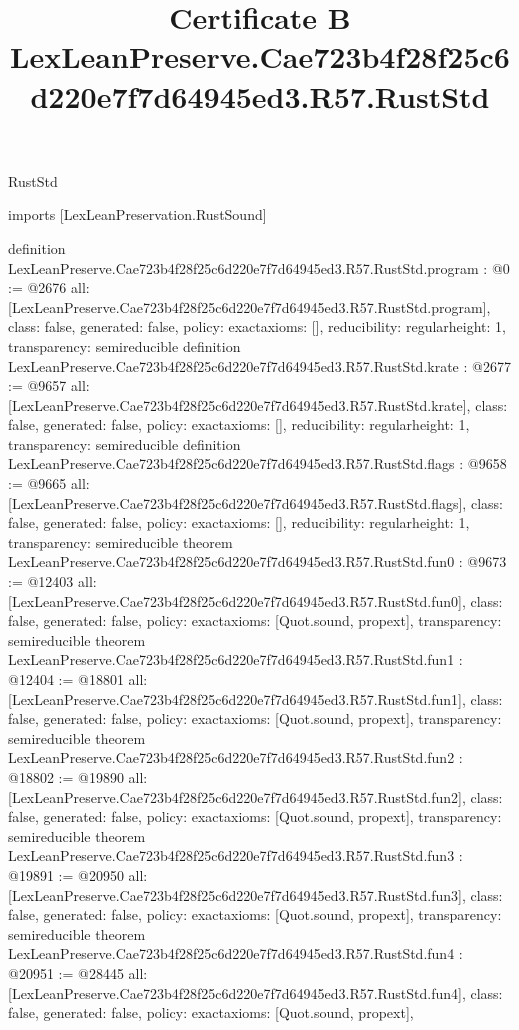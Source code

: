 \begin{lexlean}{RustStd}
\title{Certificate B LexLeanPreserve.Cae723b4f28f25c6d220e7f7d64945ed3.R57.RustStd}
\begin{coremodule}
imports [LexLeanPreservation.RustSound]

definition LexLeanPreserve.Cae723b4f28f25c6d220e7f7d64945ed3.R57.RustStd.program : @0 := @2676 {
  all: [LexLeanPreserve.Cae723b4f28f25c6d220e7f7d64945ed3.R57.RustStd.program],
  class: false,
  generated: false,
  policy: exact{axioms: []},
  reducibility: regular{height: 1},
  transparency: semireducible
}
definition LexLeanPreserve.Cae723b4f28f25c6d220e7f7d64945ed3.R57.RustStd.krate : @2677 := @9657 {
  all: [LexLeanPreserve.Cae723b4f28f25c6d220e7f7d64945ed3.R57.RustStd.krate],
  class: false,
  generated: false,
  policy: exact{axioms: []},
  reducibility: regular{height: 1},
  transparency: semireducible
}
definition LexLeanPreserve.Cae723b4f28f25c6d220e7f7d64945ed3.R57.RustStd.flags : @9658 := @9665 {
  all: [LexLeanPreserve.Cae723b4f28f25c6d220e7f7d64945ed3.R57.RustStd.flags],
  class: false,
  generated: false,
  policy: exact{axioms: []},
  reducibility: regular{height: 1},
  transparency: semireducible
}
theorem LexLeanPreserve.Cae723b4f28f25c6d220e7f7d64945ed3.R57.RustStd.fun0 : @9673 := @12403 {
  all: [LexLeanPreserve.Cae723b4f28f25c6d220e7f7d64945ed3.R57.RustStd.fun0],
  class: false,
  generated: false,
  policy: exact{axioms: [Quot.sound, propext]},
  transparency: semireducible
}
theorem LexLeanPreserve.Cae723b4f28f25c6d220e7f7d64945ed3.R57.RustStd.fun1 : @12404 := @18801 {
  all: [LexLeanPreserve.Cae723b4f28f25c6d220e7f7d64945ed3.R57.RustStd.fun1],
  class: false,
  generated: false,
  policy: exact{axioms: [Quot.sound, propext]},
  transparency: semireducible
}
theorem LexLeanPreserve.Cae723b4f28f25c6d220e7f7d64945ed3.R57.RustStd.fun2 : @18802 := @19890 {
  all: [LexLeanPreserve.Cae723b4f28f25c6d220e7f7d64945ed3.R57.RustStd.fun2],
  class: false,
  generated: false,
  policy: exact{axioms: [Quot.sound, propext]},
  transparency: semireducible
}
theorem LexLeanPreserve.Cae723b4f28f25c6d220e7f7d64945ed3.R57.RustStd.fun3 : @19891 := @20950 {
  all: [LexLeanPreserve.Cae723b4f28f25c6d220e7f7d64945ed3.R57.RustStd.fun3],
  class: false,
  generated: false,
  policy: exact{axioms: [Quot.sound, propext]},
  transparency: semireducible
}
theorem LexLeanPreserve.Cae723b4f28f25c6d220e7f7d64945ed3.R57.RustStd.fun4 : @20951 := @28445 {
  all: [LexLeanPreserve.Cae723b4f28f25c6d220e7f7d64945ed3.R57.RustStd.fun4],
  class: false,
  generated: false,
  policy: exact{axioms: [Quot.sound, propext]},
}
\end{coremodule}
\end{lexlean}
